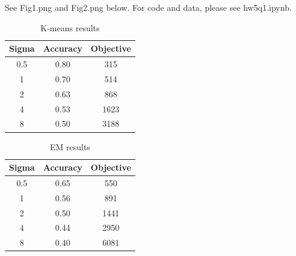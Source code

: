 \begin{itemize}
\begin{soln}
    See Fig1.png and Fig2.png below.
    For code and data, please see hw5q1.ipynb.
    \begin{table}[h]
    \centering
    \begin{tabular}{|c|c|c|}
    \hline
    \textbf{Sigma} & \textbf{Accuracy} & \textbf{Objective} \\ \hline
    0.5 & 0.80 & 315 \\ \hline
    1 & 0.70 & 514 \\ \hline
    2 & 0.63 & 868 \\ \hline
    4 & 0.53 & 1623 \\ \hline
    8 & 0.50 & 3188 \\ \hline
    \end{tabular}
    \caption{K-means results}
    \label{tab:obj1}
    \end{table}
    \begin{table}[h]
    \centering
    \begin{tabular}{|c|c|c|}
    \hline
    \textbf{Sigma} & \textbf{Accuracy} & \textbf{Objective} \\ \hline
    0.5 & 0.65 & 550 \\ \hline
    1 & 0.56 & 891 \\ \hline
    2 & 0.50 & 1441 \\ \hline
    4 & 0.44 & 2950 \\ \hline
    8 & 0.40 & 6081 \\ \hline
    \end{tabular}
    \caption{EM results}
    \label{tab:obj2}
    \end{table}
    

\end{soln}
\end{itemize}
